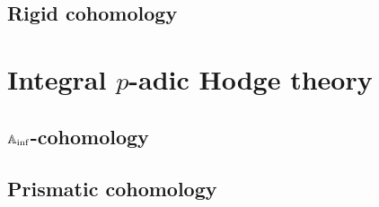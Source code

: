             
            
            
            
        \chapter{Rigid cohomology}
            \begin{abstract}
                
            \end{abstract}
            
            \minitoc
            
            
            
            
            
            
        
        
    \part{Integral \texorpdfstring{$p$}{}-adic Hodge theory}
        \chapter{\texorpdfstring{$\mathbb{A}_{\inf}$}{}-cohomology}
            \begin{abstract}
                
            \end{abstract}
            
            \minitoc
    
        \chapter{Prismatic cohomology}
            \begin{abstract}
                
            \end{abstract}
            
            \minitoc
            
            
            
            
            
            
	
	\printbibliography

